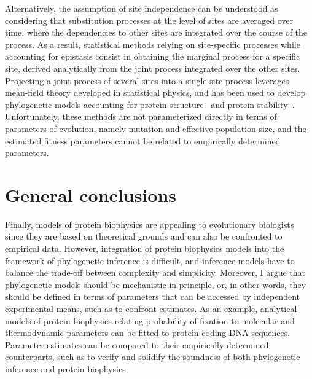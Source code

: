Alternatively, the assumption of site independence can be understood as considering that substitution processes at the level of sites are averaged over time, where the dependencies to other sites are integrated over the course of the process.
As a result, statistical methods relying on site-specific processes while accounting for epistasis consist in obtaining the marginal process for a specific site, derived analytically from the joint process integrated over the other sites.
Projecting a joint process of several sites into a single site process leverages mean-field theory developed in statistical physics, and has been used to develop phylogenetic models accounting for protein structure~\citep{Chi2018} and protein stability~\citep{Arenas2015a, Arenas2017}.
Unfortunately, these methods are not parameterized directly in terms of parameters of evolution, namely mutation and effective population size, and the estimated fitness parameters cannot be related to empirically determined parameters.

\section{General conclusions}

Finally, models of protein biophysics are appealing to evolutionary biologists since they are based on theoretical grounds and can also be confronted to empirical data.
However, integration of protein biophysics models into the framework of phylogenetic inference is difficult, and inference models have to balance the trade-off between complexity and simplicity.
Moreover, I argue that phylogenetic models should be mechanistic in principle, or, in other words, they should be defined in terms of parameters that can be accessed by independent experimental means, such as to confront estimates.
As an example, analytical models of protein biophysics relating probability of fixation to molecular and thermodynamic parameters can be fitted to protein-coding \acrshort{DNA} sequences.
Parameter estimates can be compared to their empirically determined counterparts, such as to verify and solidify the soundness of both phylogenetic inference and protein biophysics.
